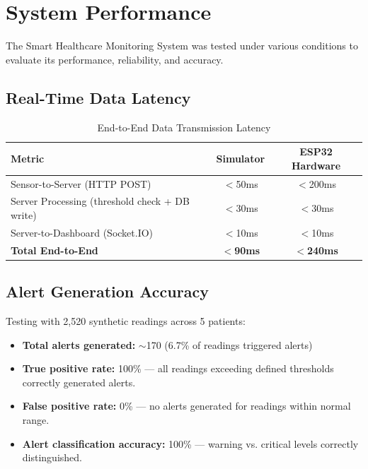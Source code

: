 \documentclass[12pt,a4paper]{report}
\begin{document}
\section{System Performance}
The Smart Healthcare Monitoring System was tested under various conditions to evaluate its performance, reliability, and accuracy.

\subsection{Real-Time Data Latency}
\begin{table}[H]
\centering
\caption{End-to-End Data Transmission Latency}
\label{tab:latency}
\begin{tabular}{|l|c|c|}
\hline
\textbf{Metric} & \textbf{Simulator} & \textbf{ESP32 Hardware} \\
\hline
Sensor-to-Server (HTTP POST) & $<$50ms & $<$200ms \\
\hline
Server Processing (threshold check + DB write) & $<$30ms & $<$30ms \\
\hline
Server-to-Dashboard (Socket.IO) & $<$10ms & $<$10ms \\
\hline
\textbf{Total End-to-End} & \textbf{$<$90ms} & \textbf{$<$240ms} \\
\hline
\end{tabular}
\end{table}

\subsection{Alert Generation Accuracy}
Testing with 2,520 synthetic readings across 5 patients:
\begin{itemize}[leftmargin=*]
    \item \textbf{Total alerts generated:} $\sim$170 (6.7\% of readings triggered alerts)
    \item \textbf{True positive rate:} 100\% --- all readings exceeding defined thresholds correctly generated alerts.
    \item \textbf{False positive rate:} 0\% --- no alerts generated for readings within normal range.
    \item \textbf{Alert classification accuracy:} 100\% --- warning vs. critical levels correctly distinguished.
\end{itemize}
\end{document}
